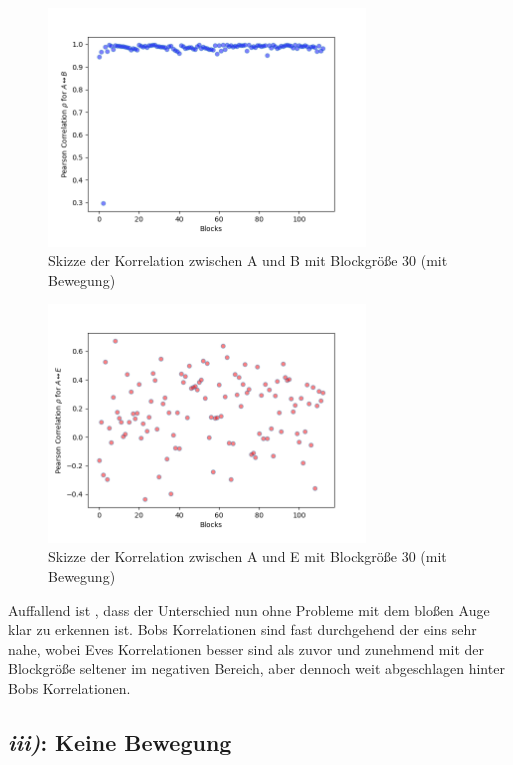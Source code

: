 \documentclass[12pt,a4paper]{article}
\begin{document}
\begin{figure}[hbt!]
	\centering
		\includegraphics[width=0.75\textwidth ]
		{Bilder/a3-t2-block30-correlation-AB.png}
		\caption{Skizze der Korrelation zwischen A und B mit Blockgröße 30 (mit Bewegung)}
		\label{fig:Label6}
\end{figure}

\begin{figure}[hbt!]
	\centering
		\includegraphics[width=0.75\textwidth ]
		{Bilder/a3-t2-block30-correlation-AE.png}
		\caption{Skizze der Korrelation zwischen A und E mit Blockgröße 30 (mit Bewegung)}
		\label{fig:Label7}
\end{figure}



Auffallend ist , dass der Unterschied nun ohne Probleme mit dem bloßen 
Auge klar zu erkennen ist. Bobs Korrelationen sind fast durchgehend der 
eins sehr nahe, wobei Eves Korrelationen besser sind als zuvor und 
zunehmend mit der Blockgröße seltener im negativen Bereich, aber dennoch
weit abgeschlagen hinter Bobs Korrelationen.


\subsection*{\textit{iii)}: Keine Bewegung}
\end{document}
